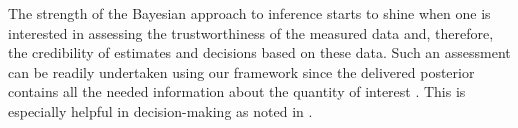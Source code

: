 The strength of the Bayesian approach to inference starts to shine when one is
interested in assessing the trustworthiness of the measured data and, therefore,
the credibility of estimates and decisions based on these data. Such an
assessment can be readily undertaken using our framework since the delivered
posterior contains all the needed information about the quantity of interest \g.
This is especially helpful in decision-making as noted in
.
